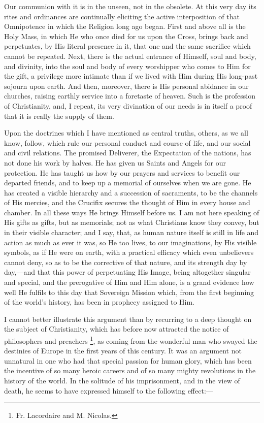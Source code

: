 Our communion with it is in the unseen, not in the obsolete. At
this very day its rites and ordinances are continually eliciting the
active interposition of that Omnipotence in which the Religion long
ago began. First and above all is the Holy Mass, in which He who once
died for us upon the Cross, brings back and perpetuates, by His
literal presence in it, that one and the same sacrifice which cannot
be repeated. Next, there is the actual entrance of Himself, soul and
body, and divinity, into the soul and body of every worshipper who
comes to Him for the gift, a privilege more intimate than if we lived
with Him during His long-past sojourn upon earth. And then, moreover,
there is His personal abidance in our churches, raising earthly
service into a foretaste of heaven. Such is the profession of
Christianity, and, I repeat, its very divination of our needs is in
itself a proof that it is really the supply of them.

Upon the doctrines which I have mentioned as central truths,
others, as we all know, follow, which rule our personal conduct and
course of life, and our social and civil relations. The promised
Deliverer, the Expectation of the nations, has not done his work by
halves. He has given us Saints and Angels for our protection. He
has taught us how by our prayers and services to benefit our departed
friends, and to keep up a memorial of ourselves when we are gone. He
has created a visible hierarchy and a succession of sacraments, to be
the channels of His mercies, and the Crucifix secures the thought of
Him in every house and chamber. In all these ways He brings Himself
before us. I am not here speaking of His gifts as gifts, but as
memorials; not as what Christians know they convey, but in their
visible character; and I say, that, as human nature itself is still in
life and action as much as ever it was, so He too lives, to our
imaginations, by His visible symbols, as if He were on earth, with a
practical efficacy which even unbelievers cannot deny, so as to be the
corrective of that nature, and its strength day by day,—and that
this power of perpetuating His Image, being altogether singular and
special, and the prerogative of Him and Him alone, is a grand evidence
how well He fulfils to this day that Sovereign Mission which, from the
first beginning of the world's history, has been in prophecy assigned
to Him.

I cannot better illustrate this argument than by recurring to a
deep thought on the subject of Christianity, which has before now
attracted the notice of philosophers and preachers \footnote{Fr. Lacordaire
and M. Nicolas.}, as coming from the wonderful man who swayed the destinies of
Europe in the first years of this century. It was an argument not
unnatural in one who had that special passion for human glory, which
has been the incentive of so many heroic careers and of so many
mighty revolutions in the history of the world. In the solitude of his
imprisonment, and in the view of death, he seems to have expressed
himself to the following effect:—

